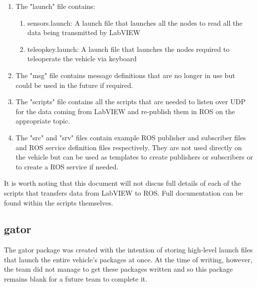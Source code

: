 \begin{enumerate}
\item The "launch" file contains:
\begin{enumerate}
\item sensors.launch: A launch file that launches all the nodes to read all the data being transmitted by LabVIEW
\item teleop\textunderscore key.launch: A launch file that launches the nodes required to teleoperate the vehicle via keyboard
\end{enumerate}
\item The "msg" file contains message definitions that are no longer in use but could be used in the future if required.
\item The "scripts" file contains all the scripts that are needed to listen over UDP for the data coming from LabVIEW and re-publish them in ROS on the appropriate topic.
\item The "src" and "srv" files contain example ROS publisher and subscriber files and ROS service definition files respectively. They are not used directly on the vehicle but can be used as templates to create publishers or subscribers or to create a ROS service if needed.
\end{enumerate}

\noindent It is worth noting that this document will not discus full details of each of the scripts that transfers data from LabVIEW to ROS. Full documentation can be found within the scripts themselves.

\subsection{gator}

The gator package was created with the intention of storing high-level launch files that launch the entire vehicle's packages at once. At the time of writing, however, the team did not manage to get these packages written and so this package remains blank for a future team to complete it.